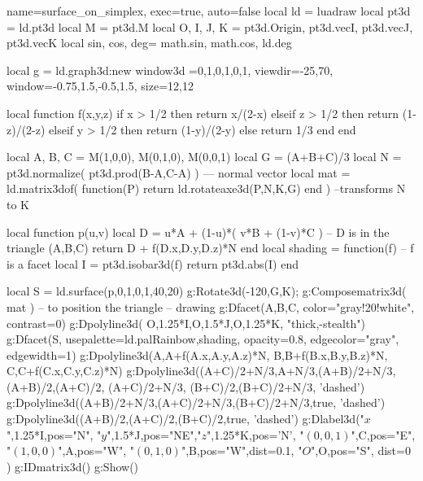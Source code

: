 \documentclass[border=5pt]{standalone}%
\begin{document}
\begin{luadraw}{name=surface_on_simplex, exec=true, auto=false}
local ld = luadraw
local pt3d = ld.pt3d
local M = pt3d.M
local O, I, J, K = pt3d.Origin, pt3d.vecI, pt3d.vecJ, pt3d.vecK
local sin, cos, deg= math.sin, math.cos, ld.deg

local g = ld.graph3d:new{ window3d ={0,1,0,1,0,1}, viewdir={-25,70}, window={-0.75,1.5,-0.5,1.5},
size={12,12} }

local function f(x,y,z)
    if x > 1/2 then return x/(2-x) 
    elseif z > 1/2 then return (1-z)/(2-z) 
    elseif y > 1/2 then return (1-y)/(2-y)
    else return 1/3
    end
end    

local A, B, C = M(1,0,0), M(0,1,0), M(0,0,1)
local G = (A+B+C)/3
local N = pt3d.normalize( pt3d.prod(B-A,C-A) ) --- normal vector
local mat = ld.matrix3dof( function(P) return ld.rotateaxe3d(P,N,K,G) end ) --transforms N to K

local function p(u,v)
    local D = u*A + (1-u)*( v*B + (1-v)*C ) -- D is in the triangle (A,B,C)
        return D + f(D.x,D.y,D.z)*N
end
local shading = function(f) -- f is a facet
    local I = pt3d.isobar3d(f)
    return pt3d.abs(I)
end

local S = ld.surface(p,0,1,0,1,{40,20})
g:Rotate3d(-120,{G,K}); g:Composematrix3d( mat ) -- to position the triangle
-- drawing
g:Dfacet({A,B,C}, {color="gray!20!white", contrast=0})
g:Dpolyline3d( {{O,1.25*I},{O,1.5*J},{O,1.25*K}}, "thick,-stealth")
g:Dfacet(S, {usepalette={ld.palRainbow,shading}, opacity=0.8, edgecolor="gray", edgewidth=1})
g:Dpolyline3d({{A,A+f(A.x,A.y,A.z)*N}, {B,B+f(B.x,B.y,B.z)*N}, {C,C+f(C.x,C.y,C.z)*N}})
g:Dpolyline3d({{(A+C)/2+N/3,A+N/3,(A+B)/2+N/3,(A+B)/2},{(A+C)/2, (A+C)/2+N/3}, {(B+C)/2,(B+C)/2+N/3}}, 'dashed')
g:Dpolyline3d({(A+B)/2+N/3,(A+C)/2+N/3,(B+C)/2+N/3},true, 'dashed')
g:Dpolyline3d({(A+B)/2,(A+C)/2,(B+C)/2},true, 'dashed')
g:Dlabel3d("$x$",1.25*I,{pos="N"}, "$y$",1.5*J,{pos="NE"},"$z$",1.25*K,{pos='N'},
    "$(0,0,1)$",C,{pos="E"}, "$(1,0,0)$",A,{pos="W"}, 
    "$(0,1,0)$",B,{pos="W",dist=0.1}, "$O$",O,{pos="S", dist=0}
)
g:IDmatrix3d()
g:Show()
\end{luadraw}
\end{document}

